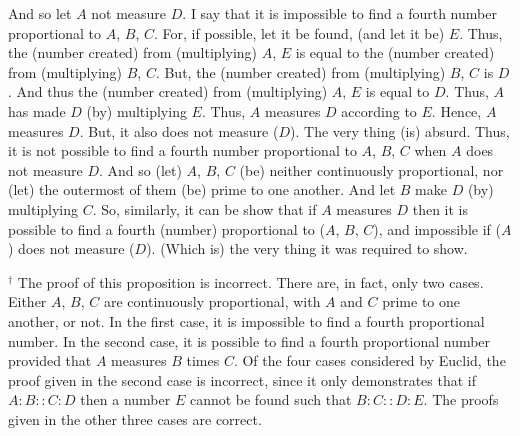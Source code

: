 \begin{Parallel}{}{}
{And so let $A$ not measure $D$. I say that it is impossible to find a fourth
number proportional to $A$, $B$, $C$. For, if possible, let it 
be found, (and let it be) $E$. Thus, the (number created) from
(multiplying) $A$, $E$ is equal to the (number created) from (multiplying)
$B$, $C$. But, the (number created) from (multiplying) $B$, $C$ is $D$.
And thus the (number created) from (multiplying) $A$, $E$ is equal to $D$.
Thus, $A$ has made $D$ (by) multiplying $E$. Thus, $A$ measures
$D$ according to $E$. Hence, $A$ measures $D$. But, it also does not
measure ($D$). The very thing (is) absurd. Thus, it is not possible
to find a fourth number proportional to $A$, $B$, $C$ when $A$ does not
measure $D$. And so (let) $A$, $B$, $C$ (be) neither continuously
proportional, nor (let) the outermost of them (be) prime to one another.
And let $B$ make $D$ (by) multiplying $C$. So, similarly, it can be show that
if $A$ measures $D$ then it is possible to find a fourth (number)
proportional to ($A$, $B$, $C$), and impossible if ($A$) does not measure ($D$).
(Which is) the very thing it was required to show.}
\end{Parallel}
{\footnotesize\noindent$^\dag$ The proof of this proposition is incorrect.
There are, in fact, only two cases. Either $A$, $B$, $C$ are continuously
proportional,  with $A$ and $C$ prime to one another, or not. In the first case, 
it is impossible to find a fourth proportional number. In the second case,
it is possible to find a fourth proportional number provided that $A$
measures $B$ times $C$. Of the four cases considered by Euclid,
the proof given in the second case is incorrect, since it only demonstrates that
if $A:B::C:D$ then a number $E$ cannot be found such that $B:C::D:E$. The proofs given in the other three cases are correct.}

